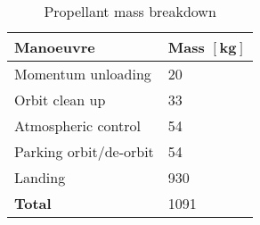 \begin{table}[H]
	\centering
	\caption{Propellant mass breakdown}
	\label{tab:PropMass}
	\begin{tabular}{|p{}|p{}|} \hline
		\textbf {Manoeuvre}             & \textbf{Mass $\mathbf{[kg]}$ } \\ \hline \hline
		Momentum unloading       &		 20       \\ \hline
		Orbit clean up &		  33      \\ \hline
		Atmospheric control           		   &  54      \\ \hline 
		Parking orbit/de-orbit            	   & 54    \\ \hline
		Landing            	   &  930     \\ \hline \hline
		\textbf {Total}                 &  1091      \\ \hline
	\end{tabular}
\end{table}
